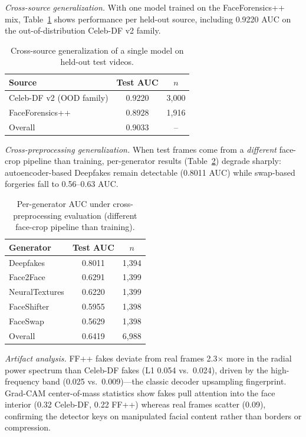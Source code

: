 \documentclass[conference]{IEEEtran}
\begin{document}
\emph{Cross-source generalization.} With one model trained on the FaceForensics++ mix, Table~\ref{tab:crosssource} shows performance per held-out source, including 0.9220 AUC on the out-of-distribution Celeb-DF v2 family.

\begin{table}[htbp]
\caption{Cross-source generalization of a single model on held-out test videos.}
\label{tab:crosssource}
\centering
\renewcommand{\arraystretch}{1.15}
\begin{tabular}{@{}lcc@{}}
\toprule
Source & Test AUC & $n$\\
\midrule
Celeb-DF v2 (OOD family) & 0.9220 & 3{,}000\\
FaceForensics++ & 0.8928 & 1{,}916\\
Overall & 0.9033 & --\\
\bottomrule
\end{tabular}
\end{table}

\emph{Cross-preprocessing generalization.} When test frames come from a \emph{different} face-crop pipeline than training, per-generator results (Table~\ref{tab:crossgen}) degrade sharply: autoencoder-based Deepfakes remain detectable (0.8011 AUC) while swap-based forgeries fall to 0.56--0.63 AUC.

\begin{table}[htbp]
\caption{Per-generator AUC under cross-preprocessing evaluation (different face-crop pipeline than training).}
\label{tab:crossgen}
\centering
\renewcommand{\arraystretch}{1.15}
\begin{tabular}{@{}lcc@{}}
\toprule
Generator & Test AUC & $n$\\
\midrule
Deepfakes & 0.8011 & 1{,}394\\
Face2Face & 0.6291 & 1{,}399\\
NeuralTextures & 0.6220 & 1{,}399\\
FaceShifter & 0.5955 & 1{,}398\\
FaceSwap & 0.5629 & 1{,}398\\
\midrule
Overall & 0.6419 & 6{,}988\\
\bottomrule
\end{tabular}
\end{table}

\emph{Artifact analysis.} FF++ fakes deviate from real frames 2.3$\times$ more in the radial power spectrum than Celeb-DF fakes (L1 0.054 vs.\ 0.024), driven by the high-frequency band (0.025 vs.\ 0.009)---the classic decoder upsampling fingerprint. Grad-CAM center-of-mass statistics show fakes pull attention into the face interior (0.32 Celeb-DF, 0.22 FF++) whereas real frames scatter (0.09), confirming the detector keys on manipulated facial content rather than borders or compression.
\end{document}
